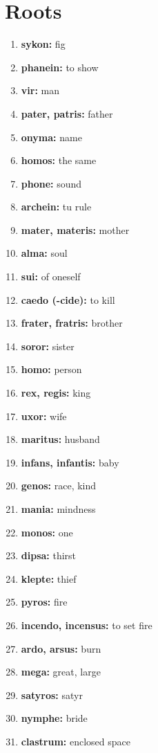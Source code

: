 \documentclass{article}
\begin{document}
\section{Roots}
\begin{enumerate}
    \item \textbf{sykon: }{fig}
    \item \textbf{phanein: }{to show}
    \item \textbf{vir: }{man}
    \item \textbf{pater, patris: }{father}
    \item \textbf{onyma: }{name}
    \item \textbf{homos: }{the same}
    \item \textbf{phone: }{sound}
    \item \textbf{archein: }{tu rule}
    \item \textbf{mater, materis: }{mother}
    \item \textbf{alma: }{soul}
    \item \textbf{sui: }{of oneself}
    \item \textbf{caedo (-cide): }{to kill}
    \item \textbf{frater, fratris: }{brother}
    \item \textbf{soror: }{sister}
    \item \textbf{homo: }{person}
    \item \textbf{rex, regis: }{king}
    \item \textbf{uxor: }{wife}
    \item \textbf{maritus: }{husband}
    \item \textbf{infans, infantis: }{baby}
    \item \textbf{genos: }{race, kind}
    \item \textbf{mania: }{mindness}
    \item \textbf{monos: }{one}
    \item \textbf{dipsa: }{thirst}
    \item \textbf{klepte: }{thief}
    \item \textbf{pyros: }{fire}
    \item \textbf{incendo, incensus: }{to set fire}
    \item \textbf{ardo, arsus: }{burn}
    \item \textbf{mega: }{great, large}
    \item \textbf{satyros: }{satyr}
    \item \textbf{nymphe: }{bride}
    \item \textbf{clastrum: }{enclosed space}

\end{enumerate}
\end{document}
